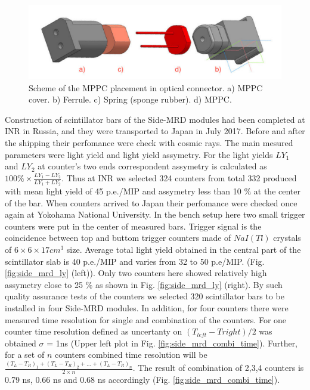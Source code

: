 \begin{figure}[tbh]
\begin{center}
\includegraphics[width=0.8\linewidth]{fig/side_mrd_optical_scheme.pdf}
\end{center}
\caption{
Scheme of the MPPC placement in optical connector.  a) MPPC cover. b) Ferrule. c) Spring (sponge rubber). d) MPPC.
}
\label{fig:side_mrd_optical_scheme}
\end{figure}

Construction of scintillator bars of the Side-MRD modules had been completed at INR in Russia, and they were transported to Japan in July 2017. Before and after the shipping their perfomance were check with cosmic rays. The main mesured parameters were light yield and light yield assymetry. For the light yields $LY_{1}$ and $LY_{2}$ at counter's two ends correspondent assymetry is calculated as $100\% \times \frac{LY_{1}-LY_{2}}{LY_{1}+LY_{2}}$. Thus at INR we selected 324 counters from total 332 produced with mean light yield of 45 p.e./MIP and assymetry less than 10 \% at the center of the bar. When counters arrived to Japan their perfomance were checked once again at Yokohama National University. In the bench setup here two small trigger counters were put in the center of measured bars. Trigger signal is the coincidence between top and buttom trigger counters made of $NaI (Tl)$ crystals of $6 \times 6 \times 17 cm^{3}$ size. Average total light yield obtained in the central part of the scintillator slab is 40 p.e./MIP and varies from 32 to 50 p.e/MIP. (Fig. \ref{fig:side_mrd_ly} (left)). Only two counters here showed relatively high assymetry close to 25 \% as shown in Fig. \ref{fig:side_mrd_ly} (right). By such quality assurance tests of the counters we selected 320 scintillator bars to be installed in four Side-MRD modules. In addition, for four counters there were measured time resolution for single and combination of the counters. For one counter time resolution defined as uncertanty on $(T_{left}-T{right})/2$ was obtained $\sigma$ = 1ns (Upper left plot in Fig. \ref{fig:side_mrd_combi_time}). Further, for a set of $n$ counters combined time resolution will be $\frac{(T_{L}-T_{R})_{1}+(T_{L}-T_{R})_{2}+...+(T_{L}-T_{R})_{n}}{2 \times n}$. The result of combination of 2,3,4 counters is 0.79 ns, 0.66 ns and 0.68 ns accordingly (Fig. \ref{fig:side_mrd_combi_time}).  
